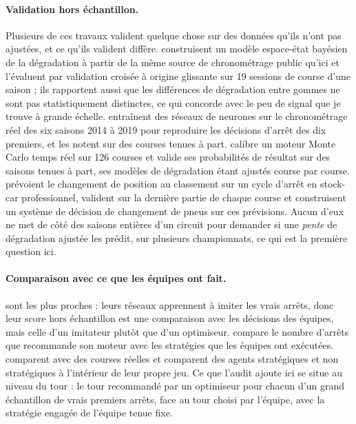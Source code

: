 \documentclass[11pt,a4paper]{article}
\begin{document}
\paragraph{Validation hors échantillon.} Plusieurs de ces travaux valident
quelque chose sur des données qu'ils n'ont pas ajustées, et ce qu'ils valident
diffère. \citet{cappello2026} construisent un modèle espace-état bayésien de la
dégradation à partir de la même source de chronométrage public qu'ici et
l'évaluent par validation croisée à origine glissante sur 19 sessions de course
d'une saison ; ils rapportent aussi que les différences de dégradation entre
gommes ne sont pas statistiquement distinctes, ce qui concorde avec le peu de
signal que je trouve à grande échelle. \citet{heilmeier2020nn} entraînent des
réseaux de neurones sur le chronométrage réel des six saisons 2014 à 2019 pour
reproduire les décisions d'arrêt des dix premiers, et les notent sur des courses
tenues à part. \citet{santillana2026} calibre un moteur Monte Carlo temps réel
sur 126 courses et valide ses probabilités de résultat sur des saisons tenues à
part, ses modèles de dégradation étant ajustés course par course.
\citet{tulabandhula2014} prévoient le changement de position au classement sur
un cycle d'arrêt en stock-car professionnel, valident sur la dernière partie de
chaque course et construisent un système de décision de changement de pneus sur
ces prévisions. Aucun d'eux ne met de côté des saisons entières d'un circuit
pour demander si une \emph{pente} de dégradation ajustée les prédit, sur
plusieurs championnats, ce qui est la première question ici.

\paragraph{Comparaison avec ce que les équipes ont fait.} \citet{heilmeier2020nn}
sont les plus proches : leurs réseaux apprennent à imiter les vrais arrêts, donc
leur score hors échantillon est une comparaison avec les décisions des équipes,
mais celle d'un imitateur plutôt que d'un optimiseur. \citet{santillana2026}
compare le nombre d'arrêts que recommande son moteur avec les stratégies que les
équipes ont exécutées. \citet{bekker2009} comparent avec des courses réelles et
\citet{aguad2024} comparent des agents stratégiques et non stratégiques à
l'intérieur de leur propre jeu. Ce que l'audit ajoute ici se situe au niveau du
tour : le tour recommandé par un optimiseur pour chacun d'un grand échantillon
de vrais premiers arrêts, face au tour choisi par l'équipe, avec la stratégie
engagée de l'équipe tenue fixe.
\end{document}
